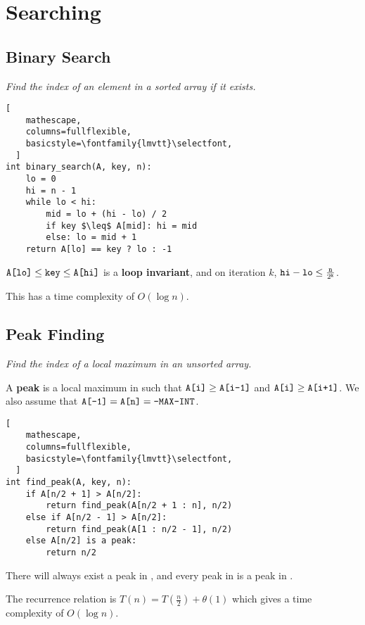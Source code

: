 \section{Searching}

\subsection{Binary Search}
\emph{Find the index of an element in a sorted array if it exists.}

\begin{lstlisting}[
    mathescape,
    columns=fullflexible,
    basicstyle=\fontfamily{lmvtt}\selectfont,
  ]
int binary_search(A, key, n):
    lo = 0
    hi = n - 1
    while lo < hi:
        mid = lo + (hi - lo) / 2
        if key $\leq$ A[mid]: hi = mid
        else: lo = mid + 1
    return A[lo] == key ? lo : -1 
\end{lstlisting}

$\texttt{A[lo]} \leq \texttt{key} \leq \texttt{A[hi]}$ is a \textbf{loop invariant},
and on iteration $k$, $\texttt{hi} - \texttt{lo} \leq \frac{\texttt{n}}{2^{\texttt{k}}}$.

This has a time complexity of $O(\log n)$.

\subsection{Peak Finding}
\emph{Find the index of a local maximum in an unsorted array.}

A \textbf{peak} is a local maximum in  such that $\texttt{A[i]} \geq \texttt{A[i-1]}$ and $\texttt{A[i]} \geq \texttt{A[i+1]}$.
We also assume that $\texttt{A[-1]} = \texttt{A[n]} = \texttt{-MAX-INT}$.

\begin{lstlisting}[
    mathescape,
    columns=fullflexible,
    basicstyle=\fontfamily{lmvtt}\selectfont,
  ]
int find_peak(A, key, n):
    if A[n/2 + 1] > A[n/2]:
        return find_peak(A[n/2 + 1 : n], n/2)
    else if A[n/2 - 1] > A[n/2]:
        return find_peak(A[1 : n/2 - 1], n/2)
    else A[n/2] is a peak:
        return n/2
\end{lstlisting}

There will always exist a peak in , and every peak in  is a peak in .

The recurrence relation is $T(n) = T(\frac{n}{2}) + \theta(1)$ which gives a time complexity of $O(\log n)$.